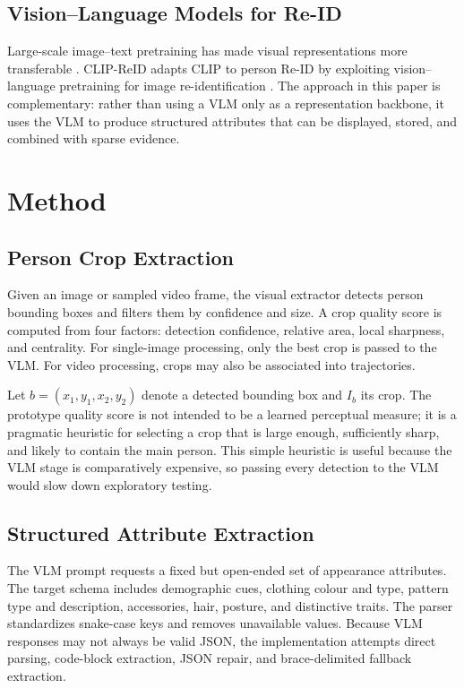 \subsection{Vision--Language Models for Re-ID}

Large-scale image--text pretraining has made visual representations more transferable \citep{radford2021learning}. CLIP-ReID adapts CLIP to person Re-ID by exploiting vision--language pretraining for image re-identification \citep{li2023clipreid}. The approach in this paper is complementary: rather than using a VLM only as a representation backbone, it uses the VLM to produce structured attributes that can be displayed, stored, and combined with sparse evidence.

\section{Method}

\subsection{Person Crop Extraction}

Given an image or sampled video frame, the visual extractor detects person bounding boxes and filters them by confidence and size. A crop quality score is computed from four factors: detection confidence, relative area, local sharpness, and centrality. For single-image processing, only the best crop is passed to the VLM. For video processing, crops may also be associated into trajectories.

Let $b=(x_1,y_1,x_2,y_2)$ denote a detected bounding box and $I_b$ its crop. The prototype quality score is not intended to be a learned perceptual measure; it is a pragmatic heuristic for selecting a crop that is large enough, sufficiently sharp, and likely to contain the main person. This simple heuristic is useful because the VLM stage is comparatively expensive, so passing every detection to the VLM would slow down exploratory testing.

\subsection{Structured Attribute Extraction}

The VLM prompt requests a fixed but open-ended set of appearance attributes. The target schema includes demographic cues, clothing colour and type, pattern type and description, accessories, hair, posture, and distinctive traits. The parser standardizes snake-case keys and removes unavailable values. Because VLM responses may not always be valid JSON, the implementation attempts direct parsing, code-block extraction, JSON repair, and brace-delimited fallback extraction.

